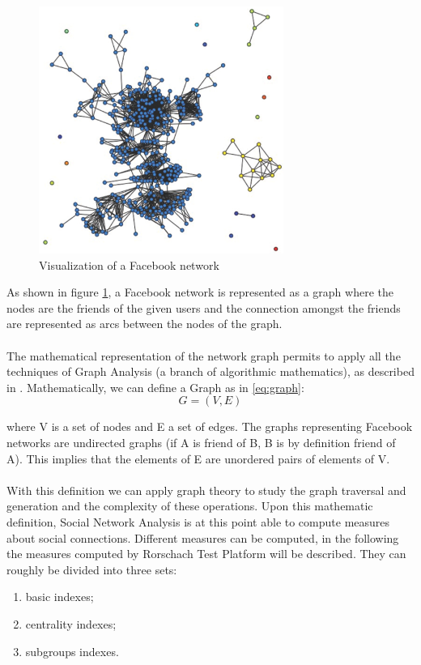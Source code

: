 \begin{figure}[h]
\centering
\includegraphics[width=8cm]{Fig1fbnetwork.eps}
\caption{Visualization of a Facebook network}
\label{fig:FBNetwork}
\end{figure}

As shown in figure \ref{fig:FBNetwork}, a Facebook network is represented as a graph where the nodes are the friends of the given users and the connection amongst the
friends are represented as arcs between the nodes of the graph.\\
\\
The mathematical representation of the network graph permits to apply all the techniques of Graph Analysis (a branch of algorithmic mathematics), as described in
\cite{Biggs-1999}.
Mathematically, we can deﬁne a Graph as in \ref{eq:graph}:\\

\begin{equation}
G = (V, E)
\label{eq:graph}
\end{equation}

where V is a set of nodes and E a set of edges.
The graphs representing Facebook networks are undirected graphs (if A is friend of B, B is by deﬁnition friend of A).
This implies that the elements of E are unordered pairs of elements of V.\\
\\
With this deﬁnition we can apply graph theory to study the graph traversal and generation and the complexity of these operations.
Upon this mathematic deﬁnition, Social Network Analysis is at this point able to compute measures about social connections.
Different measures can be computed, in the following the measures computed by Rorschach Test Platform will be described.
They can roughly be divided into three sets:
\begin{enumerate}
\item basic indexes;
\item centrality indexes;
\item subgroups indexes.
\end{enumerate}

